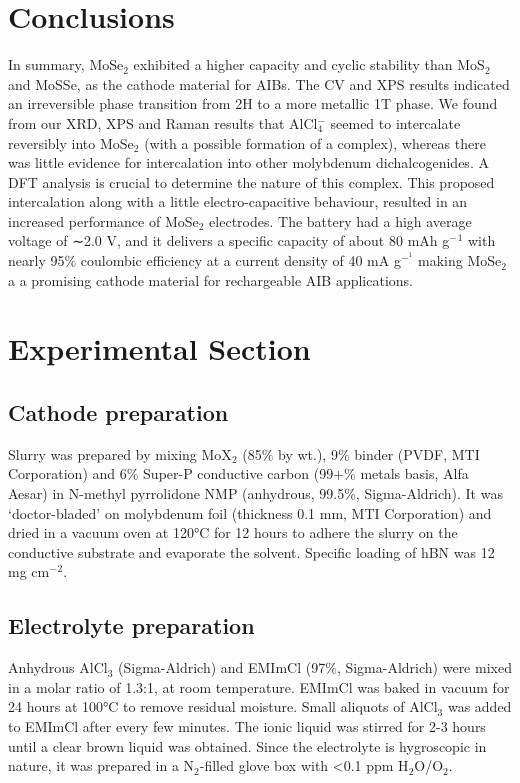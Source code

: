 \documentclass[num-refs]{wiley-article}
\begin{document}
\section{Conclusions}
In summary, MoSe$_2$ exhibited a higher capacity and cyclic stability than MoS$_2$ and MoSSe, as the cathode material for AIBs. The CV and XPS results indicated an irreversible phase transition from 2H to a more metallic 1T phase. We found from our XRD, XPS and Raman results that AlCl$_4^-$ seemed to intercalate reversibly into MoSe$_2$ (with a possible formation of a complex), whereas there was little evidence for intercalation into other molybdenum dichalcogenides.  A DFT analysis is crucial to determine the nature of this complex. This proposed intercalation along with a little electro-capacitive behaviour, resulted in an increased performance of MoSe$_2$ electrodes. The battery had a high average voltage of ∼2.0 V, and it delivers a specific capacity of about 80 mAh g$^−{^1}$ with nearly 95$\%$ coulombic efficiency at a current density of 40 mA g$^{−^1}$ making MoSe$_2$ a a promising cathode material for rechargeable AIB applications.


\section{Experimental Section}
\subsection{Cathode preparation}
Slurry was prepared by mixing MoX$_2$ (85$\%$ by wt.), 9$\%$ binder (PVDF, MTI Corporation) and 6$\%$ Super-P conductive carbon (99+$\%$ metals basis, Alfa Aesar) in N-methyl pyrrolidone NMP (anhydrous, 99.5$\%$, Sigma-Aldrich). It was ‘doctor-bladed’ on molybdenum foil (thickness 0.1 mm, MTI Corporation) and dried in a vacuum oven at 120°C for 12 hours to adhere the slurry on the conductive substrate and evaporate the solvent. Specific loading of hBN was 12 mg cm$^-{^2}$. 
\subsection{Electrolyte preparation}
Anhydrous AlCl$_3$ (Sigma-Aldrich) and EMImCl (97$\%$, Sigma-Aldrich) were mixed in a molar ratio of 1.3:1, at room temperature. EMImCl was baked in vacuum for 24 hours at 100°C to remove residual moisture. Small aliquots of AlCl$_3$ was added to EMImCl after every few minutes. The ionic liquid was stirred for 2-3 hours until a clear brown liquid was obtained. Since the electrolyte is hygroscopic in nature, it was prepared in a N$_2$-filled glove box with <0.1 ppm H$_2$O/O$_2$. 
\end{document}
